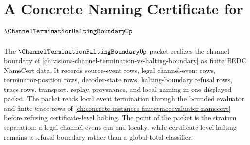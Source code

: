 \chapter{A Concrete Naming Certificate for $\ChannelTerminationHaltingBoundaryUp$}
\label{ch:concrete-instances-channel-termination-halting-boundary-namecert}

The $\ChannelTerminationHaltingBoundaryUp$ packet realizes the channel boundary of \autoref{ch:visions-channel-termination-vs-halting-boundary} as finite BEDC NameCert data. It records source-event rows, legal channel-event rows, terminator-position rows, decoder-state rows, halting-boundary refusal rows, trace rows, transport, replay, provenance, and local naming in one displayed packet. The packet reads local event termination through the bounded evaluator and finite trace rows of \autoref{ch:concrete-instances-finitetraceevaluator-namecert} before refusing certificate-level halting. The point of the packet is the stratum separation: a legal channel event can end locally, while certificate-level halting remains a refusal boundary rather than a global total classifier.

